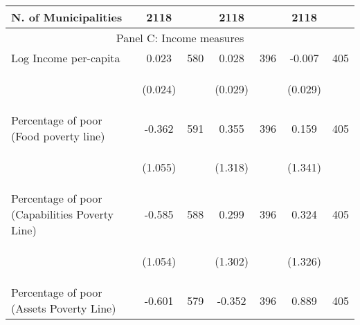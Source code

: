 \begin{tabular}{lcccccc}
N. of Municipalities  &   2118   &  &  2118    & &  2118  &    \\

\hline		

\multicolumn{7}{c}{Panel C: Income measures} \\

Log Income per-capita    &  0.023   &  580  &   0.028  &  396 &  -0.007  &  405   \\

\vspace{4pt} &  \begin{footnotesize}(0.024)\end{footnotesize}   & &
			    \begin{footnotesize}(0.029)\end{footnotesize}   & &
			    \begin{footnotesize}(0.029)\end{footnotesize}   &
			     \\          


Percentage of poor (Food poverty line)     &  -0.362   &  591  &   0.355  &  396 &  0.159  &  405   \\

\vspace{4pt} &  \begin{footnotesize}(1.055)\end{footnotesize}   & &
			    \begin{footnotesize}(1.318)\end{footnotesize}   & &
			    \begin{footnotesize}(1.341)\end{footnotesize}   &
			     \\


Percentage of poor (Capabilities Poverty Line)     &  -0.585   &  588  &   0.299  &  396 &  0.324  &  405   \\

\vspace{4pt} &  \begin{footnotesize}(1.054)\end{footnotesize}   & &
			    \begin{footnotesize}(1.302)\end{footnotesize}   & &
			    \begin{footnotesize}(1.326)\end{footnotesize}   &
			     \\
 
Percentage of poor (Assets Poverty Line)    &  -0.601   &  579  &   -0.352  &  396 &  0.889  &  405   \\


\end{tabular}
